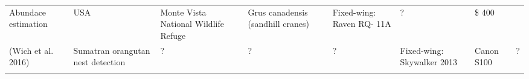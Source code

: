 \documentclass[]{interact}
\theoremstyle{plain}%
\theoremstyle{definition}
\theoremstyle{remark}
\begin{document}
\begin{longtable}[]{@{}llllllll@{}}
\begin{minipage}[t]{0.18\columnwidth}
Abundace estimation\strut
\end{minipage} & \begin{minipage}[t]{0.03\columnwidth}\raggedright\strut
USA\strut
\end{minipage} & \begin{minipage}[t]{0.14\columnwidth}\raggedright\strut
Monte Vista National Wildlife Refuge\strut
\end{minipage} & \begin{minipage}[t]{0.10\columnwidth}\raggedright\strut
Grus canadensis (sandhill cranes)\strut
\end{minipage} & \begin{minipage}[t]{0.09\columnwidth}\raggedright\strut
Fixed-wing: Raven RQ- 11A\strut
\end{minipage} & \begin{minipage}[t]{0.11\columnwidth}\raggedright\strut
?\strut
\end{minipage} & \begin{minipage}[t]{0.01\columnwidth}\raggedright\strut
\$ 400\strut
\end{minipage}\tabularnewline
\begin{minipage}[t]{0.11\columnwidth}\raggedright\strut
(Wich et al. 2016)\strut
\end{minipage} & \begin{minipage}[t]{0.18\columnwidth}\raggedright\strut
Sumatran orangutan nest detection\strut
\end{minipage} & \begin{minipage}[t]{0.03\columnwidth}\raggedright\strut
?\strut
\end{minipage} & \begin{minipage}[t]{0.14\columnwidth}\raggedright\strut
?\strut
\end{minipage} & \begin{minipage}[t]{0.10\columnwidth}\raggedright\strut
?\strut
\end{minipage} & \begin{minipage}[t]{0.09\columnwidth}\raggedright\strut
Fixed-wing: Skywalker 2013\strut
\end{minipage} & \begin{minipage}[t]{0.11\columnwidth}\raggedright\strut
Canon S100\strut
\end{minipage} & \begin{minipage}[t]{0.01\columnwidth}\raggedright\strut
?\strut
\end{minipage}\tabularnewline
\begin{minipage}[t]{0.11\columnwidth}\raggedright\strut

\end{minipage}
\end{longtable}
\end{document}
